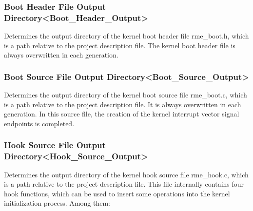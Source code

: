 \subsubsection{Boot Header File Output Directory<Boot\_Header\_Output>{}}\label{subsubsec:5-3-12-17}

Determines the output directory of the kernel boot header file rme\_boot.h, which is a path relative to the project description file. The kernel boot header file is always overwritten in each generation.

\subsubsection{Boot Source File Output Directory<Boot\_Source\_Output>{}}\label{subsubsec:5-3-12-18}

Determines the output directory of the kernel boot source file rme\_boot.c, which is a path relative to the project description file. It is always overwritten in each generation. In this source file, the creation of the kernel interrupt vector signal endpoints is completed.

\subsubsection{Hook Source File Output Directory<Hook\_Source\_Output>{}}\label{subsubsec:5-3-12-19}

Determines the output directory of the kernel hook source file rme\_hook.c, which is a path relative to the project description file. This file internally contains four hook functions, which can be used to insert some operations into the kernel initialization process. Among them:

